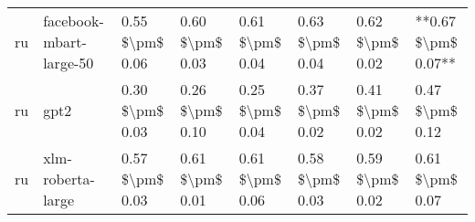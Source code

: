 \begin{tabular}{llllllll}
      ru &            facebook-mbart-large-50 & 0.55 \$\textbackslash pm\$ 0.06 &           0.60 \$\textbackslash pm\$ 0.03 &       0.61 \$\textbackslash pm\$ 0.04 &        0.63 \$\textbackslash pm\$ 0.04 &                         0.62 \$\textbackslash pm\$ 0.02 & **0.67 \$\textbackslash pm\$ 0.07** \\
      ru &                               gpt2 & 0.30 \$\textbackslash pm\$ 0.03 &           0.26 \$\textbackslash pm\$ 0.10 &       0.25 \$\textbackslash pm\$ 0.04 &        0.37 \$\textbackslash pm\$ 0.02 &                         0.41 \$\textbackslash pm\$ 0.02 &     0.47 \$\textbackslash pm\$ 0.12 \\
      ru &                  xlm-roberta-large & 0.57 \$\textbackslash pm\$ 0.03 &           0.61 \$\textbackslash pm\$ 0.01 &       0.61 \$\textbackslash pm\$ 0.06 &        0.58 \$\textbackslash pm\$ 0.03 &                         0.59 \$\textbackslash pm\$ 0.02 &     0.61 \$\textbackslash pm\$ 0.07 \\
\bottomrule
\end{tabular}

